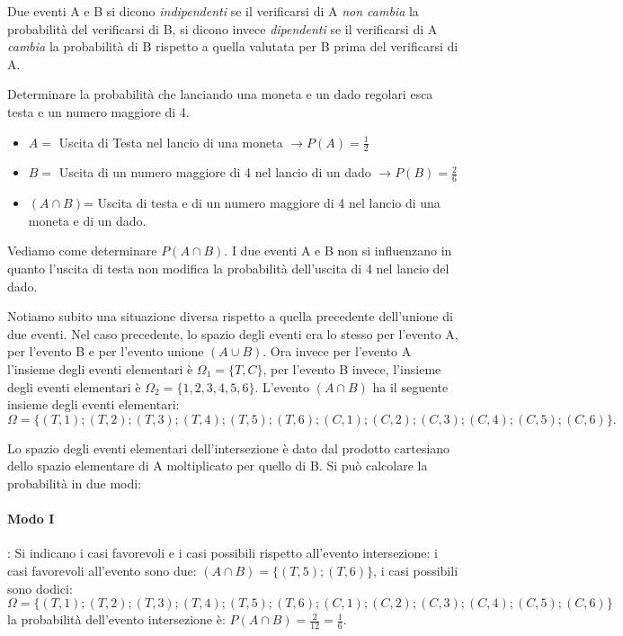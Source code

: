 Due eventi A e B si dicono \emph{indipendenti} se il verificarsi di A 
\emph{non 
cambia} la probabilità del verificarsi di B, si dicono invece 
\emph{dipendenti} 
se il verificarsi di A \emph{cambia} la probabilità di B rispetto a quella 
valutata per B prima del verificarsi di A.
\begin{esempio}
Determinare la probabilità che lanciando una moneta e un dado regolari esca 
testa e un numero maggiore di 4.
\begin{itemize}
\item \( A = \) Uscita di Testa nel lancio di una moneta \(\to P(A)=\frac 1 2\)
\item \( B = \) Uscita di un numero maggiore di 4 nel lancio di un dado \(\to 
P(B)=\frac 2 6\)
\item \((A\cap B)\)= Uscita di testa e di un numero maggiore di 4 nel lancio di 
una moneta e di un dado.
\end{itemize}
Vediamo come determinare \(P(A\cap B)\).
I due eventi A e B non si influenzano in quanto l'uscita di testa non 
modifica 
la probabilità dell'uscita di 4 nel lancio del dado.

Notiamo subito una situazione diversa rispetto a quella precedente 
dell'unione 
di due eventi. Nel caso precedente, lo spazio degli eventi era lo stesso per 
l'evento A, per l'evento B e per l'evento unione \((A\cup B)\).
Ora invece per l'evento A l'insieme degli eventi elementari è \(\Omega 
_1=\{T,C\}\), per l'evento B invece, l'insieme degli eventi elementari è 
\(\Omega 
_2=\{1,2,3,4,5,6\}\). L'evento \((A\cap B)\) ha il seguente insieme degli eventi 
elementari: \[ \Omega 
=\{(T,1);(T,2);(T,3);(T,4);(T,5);(T,6);(C,1);(C,2);(C,3);(C,4);(C,5);(C,6)\}. 
\]

Lo spazio degli eventi elementari dell'intersezione è dato dal prodotto 
cartesiano dello spazio elementare di A moltiplicato per quello di B. Si può 
calcolare la probabilità in due modi:
\paragraph{Modo I}: Si indicano i casi favorevoli e i casi possibili rispetto 
all'evento intersezione: i casi favorevoli all'evento sono due: \((A\cap 
B)=\{(T,5);(T,6)\}\), i casi possibili sono dodici: \[\Omega 
=\{(T,1);(T,2);(T,3);(T,4);(T,5);(T,6);(C,1);(C,2);(C,3);(C,4);(C,5);(C,6)\} 
\] 
la probabilità dell'evento intersezione è: \(P(A\cap B)=\frac 2{12}=\frac 1 6\).


\end{esempio}
